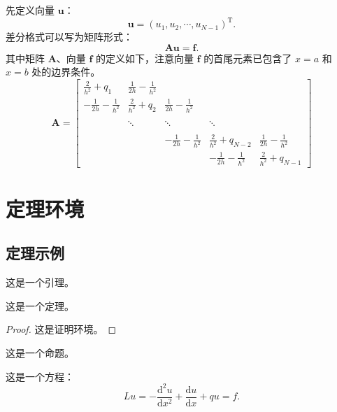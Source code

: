 \documentclass{shnuthesis}
\begin{document}
先定义向量 $\boldsymbol{u}$：
$$\boldsymbol{u}=(u_{1}, u_{2}, \cdots, u_{N-1})^{\mathrm{T}}.$$
差分格式可以写为矩阵形式：
$$\boldsymbol{A}\boldsymbol{u}=\boldsymbol{f}.
$$
其中矩阵 $\boldsymbol{A}$、向量 $\boldsymbol{f}$ 的定义如下，注意向量 $\boldsymbol{f}$ 的首尾元素已包含了 $x=a$ 和 $x=b$ 处的边界条件。
\begin{equation}\label{equ:matrix}
\boldsymbol{A}=\left[\begin{array}{cccccc}
\displaystyle \frac{2}{h^{2}}+q_{1} & \displaystyle\frac{1}{2h}-\frac{1}{h^{2}} &   &  &  \\[8pt]
 \displaystyle-\frac{1}{2h}-\frac{1}{h^{2}} & \displaystyle \frac{2}{h^{2}}+q_{2} & \displaystyle\frac{1}{2h}-\frac{1}{h^{2}}  & &  \\[8pt]
  &  &  &  &    \\
   &  \ddots  & \ddots  &   \ddots  &    \\[8pt]
   &  &  &  &    \\
  &   & \displaystyle-\frac{1}{2h}-\frac{1}{h^{2}} & \displaystyle\frac{2}{h^{2}}+q_{N-2}& \displaystyle\frac{1}{2h}-\frac{1}{h^{2}} \\[8pt]
  &  &  & \displaystyle-\frac{1}{2h}-\frac{1}{h^{2}} & \displaystyle \frac{2}{h^{2}}+q_{N-1}
\end{array}\right]
\end{equation}



\chapter{定理环境}

\section{定理示例}

\begin{lemma}[Lemma]
这是一个引理。
\end{lemma}


\begin{theorem}[Theorem]
这是一个定理。
\end{theorem}
\begin{proof}
这是证明环境。
\end{proof}

\begin{proposition}[Proposition]
这是一个命题。
\end{proposition}

这是一个方程：
\begin{equation}\label{Equ21}
L u=-\frac{\mathrm{d}^{2} u}{\mathrm{d} x^{2}}+\frac{\mathrm{d} u}{\mathrm{d} x}+q u=f.
\end{equation}
\end{document}
